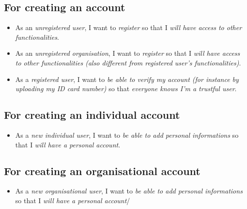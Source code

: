 \subsection{For creating an account}
\begin{itemize}
    \item As an \textit{unregistered user}, I want to \textit{register} so that I \textit{will have access to other functionalities}.
    \item As an \textit{unregistered organisation}, I want to \textit{register} so that I \textit{will have access to other functionalities (also different from registered user's functionalities)}.
    \item As a \textit{registered user}, I want to \textit{be able to verify my account (for instance by uploading my ID card number)} so that \textit{everyone knows I'm a trustful user}.
\end{itemize}


\subsection{For creating an individual account}
\begin{itemize}
    \item As a \textit{new individual user}, I want to \textit{be able to add personal informations} so that I \textit{will have a personal account}.
\end{itemize}

\subsection{For creating an organisational account}
\begin{itemize}
    \item As a \textit{new organisational user}, I want to \textit{be able to add personal informations} so that I \textit{will have a personal account}/
\end{itemize}

